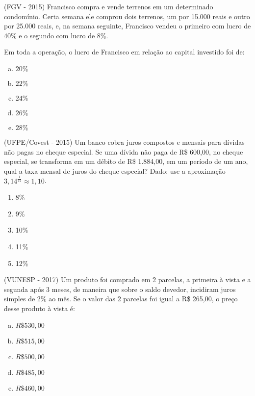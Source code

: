   \begin{exer}
  (FGV - 2015) Francisco compra e vende terrenos em um determinado condomínio. Certa semana ele comprou dois terrenos, um por 15.000 reais e outro por 25.000 reais, e, na semana seguinte, Francisco vendeu o primeiro com lucro de 40\% e o segundo com lucro de 8\%.

  Em toda a operação, o lucro de Francisco em relação ao capital investido foi de:
  \begin{enumerate}[a)]
  \item $20\%$
  \item $22\%$
  \item $24\%$
  \item $26\%$
  \item $28\%$
  \end{enumerate}
  \end{exer}

  \begin{exer}
  (UFPE/Covest - 2015) Um banco cobra juros compostos e mensais para dívidas não pagas no cheque especial. Se uma dívida não paga de R\$ 600,00, no cheque especial, se transforma em um débito de R\$ 1.884,00, em um período de um ano, qual a taxa mensal de juros do cheque especial? Dado: use a aproximação $3,14^{\frac{1}{12}} \approx 1,10$.
  \begin{enumerate}
  \item 8\%
  \item 9\%
  \item 10\%
  \item 11\%
  \item 12\%
  \end{enumerate}
  \end{exer}

  \begin{exer}
  (VUNESP - 2017) Um produto foi comprado em 2 parcelas, a primeira à vista e a segunda após 3 meses, de maneira que sobre o saldo devedor, incidiram juros simples de 2\% ao mês. Se o valor das 2 parcelas foi igual a R\$ 265,00, o preço desse produto à vista é:
  \begin{enumerate}[a)]
  \item $R\$ 530,00$
  \item $R\$ 515,00$
  \item $R\$ 500,00$
  \item $R\$ 485,00$
  \item $R\$ 460,00$
  \end{enumerate}
  \end{exer}

